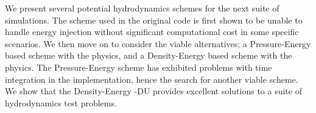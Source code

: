 We present several potential hydrodynamics schemes for the next suite of
\eagle{} simulations. The \anarchy{} scheme used in the original \eagle{}
code is first shown to be unable to handle energy injection without
significant computational cost in some specific scenarios. We then move on to
consider the viable alternatives; a Pressure-Energy based scheme with the
\anarchy{} physics, and a Density-Energy based scheme with the \anarchy{}
physics. The Pressure-Energy scheme has exhibited problems with time
integration in the \swift{} \eagle{} implementation, hence the search for
another viable scheme. We show that the Density-Energy \anarchy{}-DU provides
excellent solutions to a suite of hydrodynamics test problems.